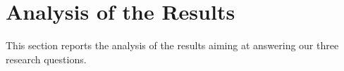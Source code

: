 
\section{Analysis of the Results}

This section reports the analysis of the results aiming at answering our three research questions.




